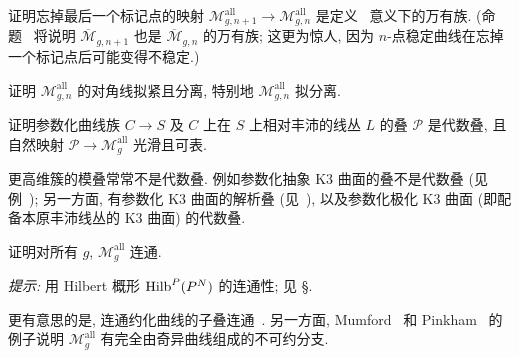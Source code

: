 \begin{exercise}[容易]\label{src:6.4.8}
证明忘掉最后一个标记点的映射 $\mathcal M_{g,\allowbreak n+1}^{\mathrm{all}}\to\mathcal M_{g,\allowbreak n}^{\mathrm{all}}$ 是定义~ 意义下的万有族. (命题~ 将说明 $\overline{\mathcal M}_{g,\allowbreak n+1}$ 也是 $\overline{\mathcal M}_{g,\allowbreak n}$ 的万有族; 这更为惊人, 因为 $n$-点稳定曲线在忘掉一个标记点后可能变得不稳定.)
\end{exercise}
\begin{exercise}[技术性]\label{src:6.4.9}
证明 $\mathcal M_{g,\allowbreak n}^{\mathrm{all}}$ 的对角线拟紧且分离, 特别地 $\mathcal M_{g,\allowbreak n}^{\mathrm{all}}$ 拟分离.
\end{exercise}
\begin{exercise}[很好的练习]\label{src:6.4.10}
证明参数化曲线族 $C\to\allowbreak S$ 及 $C$ 上在 $S$ 上相对丰沛的线丛 $L$ 的叠 $\mathcal P$ 是代数叠, 且自然映射 $\mathcal P\to\mathcal M_g^{\mathrm{all}}$ 光滑且可表.
\end{exercise}
\begin{remark}\label{src:6.4.11}
更高维簇的模叠常常不是代数叠. 例如参数化抽象 K3 曲面的叠不是代数叠 (见例~); 另一方面, 有参数化 K3 曲面的解析叠 (见~\cite[\S VII.12]{BHPV04}), 以及参数化极化 K3 曲面 (即配备本原丰沛线丛的 K3 曲面) 的代数叠.
\end{remark}
\begin{exercise}\label{src:6.4.12}
证明对所有 $g$, $\mathcal M_g^{\mathrm{all}}$ 连通.

\textit{提示:} 用 Hilbert 概形 $\operatorname{Hilb}^P(P^N)$ 的连通性; 见 \S{}.
\end{exercise}
\begin{remark}\label{src:6.4.13}
更有意思的是, 连通约化曲线的子叠连通~\cite{Boz25}. 另一方面, Mumford~\cite{Mum75b} 和 Pinkham~\cite[定理 1.11]{Pin74} 的例子说明 $\mathcal M_g^{\mathrm{all}}$ 有完全由奇异曲线组成的不可约分支.
\end{remark}
